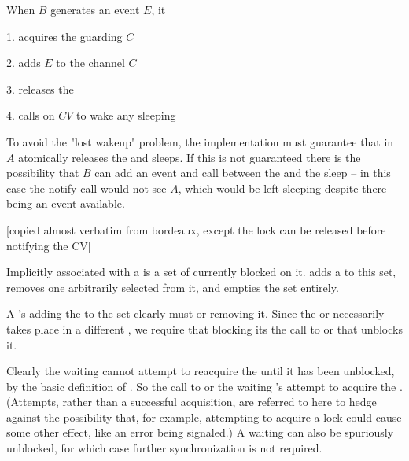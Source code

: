 When $B$ generates an event $E$, it

\beginlist
\item{1.} acquires the  guarding $C$
\item{2.} adds $E$ to the channel $C$
\item{3.} releases the 
\item{4.} calls  on $CV$ to wake any sleeping
   
\endlist

To avoid the "lost wakeup" problem, the implementation must guarantee
that  in  $A$ atomically releases
the  and sleeps. If this is not guaranteed there is the
possibility that  $B$ can add an event and call
 between the  and the
sleep -- in this case the notify call would not see $A$, which would
be left sleeping despite there being an event available.

[copied almost verbatim from bordeaux, except the lock can be released
before notifying the CV]



Implicitly associated with a  is a set of
 currently blocked on it.  adds a
 to this set,  removes one
arbitrarily selected  from it, and
 empties the set entirely.

A 's adding the  to the
set clearly must   or
 removing it. Since the
 or  necessarily
takes place in a different , we require that
 blocking its 
 the call to  or
 that unblocks it.

Clearly the waiting  cannot attempt to reacquire the
 until it has been unblocked, by the basic definition of
. So the call to 
or   the waiting
's attempt to acquire the . (Attempts, rather
than a successful acquisition, are referred to here to hedge against
the possibility that, for example, attempting to acquire a lock could
cause some other effect, like an error being signaled.) A waiting
 can also be spuriously unblocked, for which case further
synchronization is not required.

